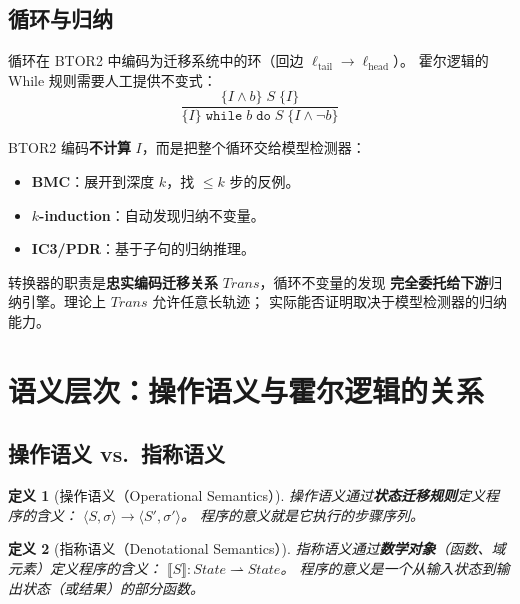 \documentclass[11pt,a4paper]{article}
\newtheorem{definition}{定义}[section]
\newcommand{\State}{\mathit{State}}
\newcommand{\Trans}{\mathit{Trans}}
\begin{document}
\subsection{循环与归纳}

循环在 BTOR2 中编码为迁移系统中的环（回边 $\ell_{\mathrm{tail}} \to \ell_{\mathrm{head}}$）。
霍尔逻辑的 While 规则需要人工提供不变式：
\[
  \frac{\{I \wedge b\}\;S\;\{I\}}
       {\{I\}\;\texttt{while}\;b\;\texttt{do}\;S\;\{I \wedge \neg b\}}
\]

BTOR2 编码\textbf{不计算} $I$，而是把整个循环交给模型检测器：
\begin{itemize}
  \item \textbf{BMC}：展开到深度 $k$，找 $\leq k$ 步的反例。
  \item \textbf{$k$-induction}：自动发现归纳不变量。
  \item \textbf{IC3/PDR}：基于子句的归纳推理。
\end{itemize}

转换器的职责是\textbf{忠实编码迁移关系} $\Trans$，循环不变量的发现
\textbf{完全委托给下游}归纳引擎。理论上 $\Trans$ 允许任意长轨迹；
实际能否证明取决于模型检测器的归纳能力。

\section{语义层次：操作语义与霍尔逻辑的关系}
\label{sec:semantic-level}

\subsection{操作语义 vs.\ 指称语义}

\begin{definition}[操作语义（Operational Semantics）]
  操作语义通过\textbf{状态迁移规则}定义程序的含义：
  $\langle S, \sigma \rangle \to \langle S', \sigma' \rangle$。
  程序的意义就是它执行的步骤序列。
\end{definition}

\begin{definition}[指称语义（Denotational Semantics）]
  指称语义通过\textbf{数学对象}（函数、域元素）定义程序的含义：
  $\llbracket S \rrbracket : \State \rightharpoonup \State$。
  程序的意义是一个从输入状态到输出状态（或结果）的部分函数。
\end{definition}
\end{document}
